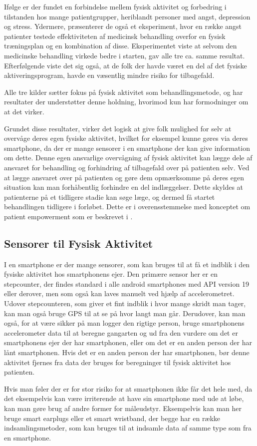 Ifølge \citet{book:sportPsyc} er der fundet en forbindelse mellem fysisk aktivitet og forbedring i tilstanden hos mange patientgrupper, heriblandt personer med angst, depression og stress.
Ydermere, præsenterer de også et eksperiment, hvor en række angst patienter testede effektiviteten af medicinsk behandling overfor en fysisk træningsplan og en kombination af disse.
Eksperimentet viste at selvom den medicinske behandling virkede bedre i starten, gav alle tre ca. samme resultat.
Efterfølgende viste det sig også, at de folk der havde været en del af det fysiske aktiveringsprogram, havde en væsentlig mindre risiko for tilbagefald.

Alle tre kilder sætter fokus på fysisk aktivitet som behandlingsmetode, \citet{art:physMental} og \citet{book:sportPsyc} har resultater der understøtter denne holdning, hvorimod \citet{misc:healthReports} kun har formodninger om at det virker.

Grundet disse resultater, virker det logisk at give folk mulighed for selv at overvåge deres egen fysiske aktivitet, hvilket for eksempel kunne gøres via deres smartphone, da der er mange sensorer i en smartphone der kan give information om dette.
Denne egen ansvarlige overvågning af fysisk aktivitet kan lægge dele af ansvaret for behandling og forhindring af tilbagefald over på patienten selv.
Ved at lægge ansvaret over på patienten og gøre dem opmærksomme på deres egen situation kan man forhåbentlig forhindre en del indlæggelser.
Dette skyldes at patienterne på et tidligere stadie kan søge læge, og dermed få startet behandlingen tidligere i forløbet.
Dette er i overensstemmelse med konceptet om patient empowerment som er beskrevet i \citep[Sektion 1.6.1]{misc:faellesrapp}. 

\subsection{Sensorer til Fysisk Aktivitet}
I en smartphone er der mange sensorer, som kan bruges til at få et indblik i den fysiske aktivitet hos smartphonens ejer.
Den primære sensor her er en stepcounter, der findes standard i alle android smartphones med API version 19 eller derover, men som også kan laves manuelt ved hjælp af accelerometret.
Udover stepcounteren, som giver et fint indblik i hvor mange skridt man tager, kan man også bruge GPS til at se på hvor langt man går.
Derudover, kan man også, for at være sikker på man logger den rigtige person, bruge smartphonens accelerometer data til at beregne gangarten \citep{4272626} og ud fra den vurdere om det er smartphonens ejer der har smartphonen, eller om det er en anden person der har lånt smartphonen.
Hvis det er en anden person der har smartphonen, bør denne aktivitet fjernes fra data der bruges for beregninger til fysisk aktivitet hos patienten.

Hvis man føler der er for stor risiko for at smartphonen ikke får det hele med, da det eksempelvis kan være irriterende at have sin smartphone med ude at løbe, kan man gøre brug af andre former for måleudstyr.
Eksempelvis kan man her bruge smart earplugs eller et smart wristband, der begge har en række indsamlingsmetoder, som kan bruges til at indsamle data af samme type som fra en smartphone.